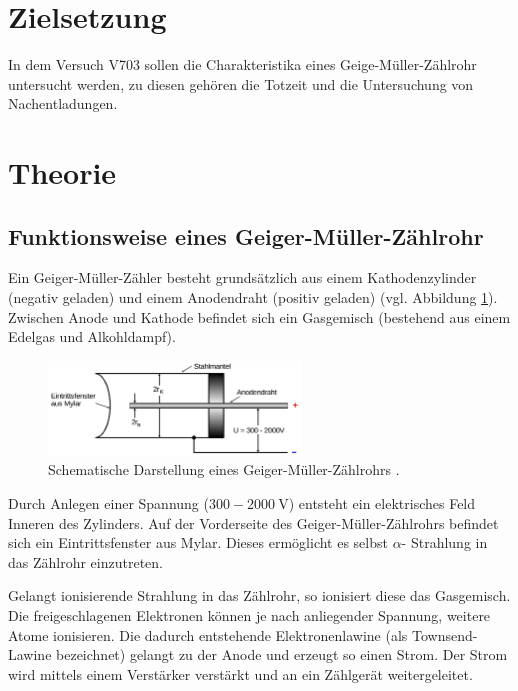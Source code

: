 \setcounter{page}{1}
\section*{Zielsetzung}

In dem Versuch V703 sollen die Charakteristika eines %
Geige-Müller-Zählrohr untersucht werden, zu diesen gehören die %
Totzeit und die Untersuchung von Nachentladungen. %

\section{Theorie}

\subsection{Funktionsweise eines Geiger-Müller-Zählrohr}
Ein Geiger-Müller-Zähler besteht grundsätzlich aus einem %
Kathodenzylinder (negativ geladen) und einem Anodendraht (positiv geladen) (vgl. Abbildung \ref{fig: schematischer_aufbau}).
Zwischen Anode und Kathode befindet sich ein Gasgemisch (bestehend aus einem Edelgas
und Alkohldampf).
\begin{figure}
  \centering
  \includegraphics[width=0.6\textwidth]{bilder/geiger_.png}
  \caption{Schematische Darstellung eines Geiger-Müller-Zählrohrs \cite{anleitung703}.}
  \label{fig: schematischer_aufbau}
  \end{figure}
Durch Anlegen einer Spannung ($300-\SI{2000}{\volt}$) entsteht ein elektrisches
Feld Inneren des Zylinders. Auf der Vorderseite des Geiger-Müller-Zählrohrs %
befindet sich ein Eintrittsfenster aus Mylar. Dieses ermöglicht es selbst $\alpha$- %
Strahlung in das Zählrohr einzutreten. %

Gelangt ionisierende Strahlung in das Zählrohr, so ionisiert diese das Gasgemisch. %
Die freigeschlagenen Elektronen können je nach anliegender Spannung, weitere Atome ionisieren. %
Die dadurch entstehende Elektronenlawine (als Townsend-Lawine bezeichnet) gelangt zu der Anode und erzeugt so
einen Strom. Der Strom wird mittels einem Verstärker verstärkt und an ein %
Zählgerät weitergeleitet.

